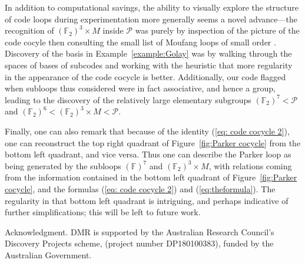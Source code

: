 \documentclass{article}
\theoremstyle{plain}
\theoremstyle{definition}
\def \cP {\mathcal{P}}
\def \FF {\mathbb{F}}
\begin{document}
In addition to computational savings, the ability to visually explore the structure of code loops during experimentation more generally seems a novel advance---the recognition of $(\FF_2)^3\times M$ inside $\cP$ was purely by inspection of the picture of the code cocyle then consulting the small list of Moufang loops of small order \cite{Chein}.
Discovery of the basis in Example~\ref{example:Golay} was by walking through the spaces of bases of subcodes and working with the heuristic that more regularity in the appearance of the code cocycle is better.
Additionally, our code flagged when subloops thus considered were in fact associative, and hence a group, leading to the discovery of the relatively large elementary subgroups $(\FF_2)^7 < \cP$ and $(\FF_2)^6 < (\FF_2)^3\times M < \cP$. 

Finally, one can also remark that because of the identity (\ref{eq: code cocycle 2}), one can reconstruct the top right quadrant of Figure~\ref{fig:Parker cocycle} from the bottom left quadrant, and vice versa. 
Thus one can describe the Parker loop as being generated by the subloops $(\FF)^7$ and $(\FF_2)^3\times M$, with relations coming from the information contained in the bottom left quadrant of Figure~\ref{fig:Parker cocycle}, and the formulas (\ref{eq: code cocycle 2}) and (\ref{eq:theformula}).
The regularity in that bottom left quadrant is intriguing, and perhaps indicative of further simplifications; this will be left to future work.





\begin{acknowledgment}{Acknowledgment.}
DMR is supported by the Australian Research Council's Discovery Projects scheme, (project number DP180100383), funded by the Australian Government.
\end{acknowledgment}
\end{document}
